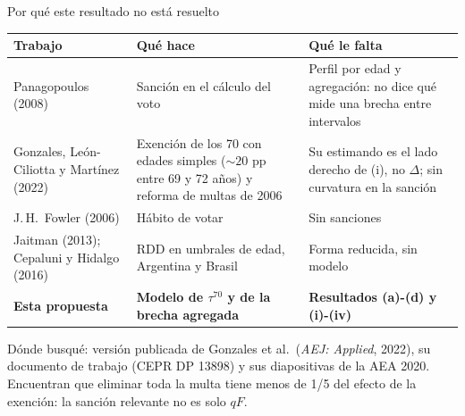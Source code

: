 \documentclass[aspectratio=169,11pt,xcolor=table]{beamer}
\begin{document}
\begin{frame}{Por qué este resultado no está resuelto}
  \footnotesize
  \renewcommand{\arraystretch}{1.4}
  \begin{tabularx}{\textwidth}{@{}L{3.6cm}YY@{}}
    \toprule
    \textbf{Trabajo} & \textbf{Qué hace} & \textbf{Qué le falta} \\
    \midrule
    Panagopoulos (2008) & Sanción en el cálculo del voto & Perfil por edad y agregación: no dice qué mide una brecha entre intervalos \\
    Gonzales, León-Ciliotta y Martínez (2022) & Exención de los 70 con edades simples (${\sim}20$ pp entre 69 y 72 años) y reforma de multas de 2006 & Su estimando es el lado derecho de (i), no $\Delta$; sin curvatura en la sanción \\
    J.\,H.\ Fowler (2006) & Hábito de votar & Sin sanciones \\
    Jaitman (2013); Cepaluni y Hidalgo (2016) & RDD en umbrales de edad, Argentina y Brasil & Forma reducida, sin modelo \\
    \textbf{Esta propuesta} & \textbf{Modelo de $\tau^{70}$ y de la brecha agregada} & \textbf{Resultados (a)-(d) y (i)-(iv)} \\
    \bottomrule
  \end{tabularx}
  \vspace{0.1cm}
  {\scriptsize\color{upgray} Dónde busqué: versión publicada de Gonzales et al.\ (\textit{AEJ: Applied}, 2022), su documento de trabajo (CEPR DP 13898) y sus diapositivas de la AEA 2020. Encuentran que eliminar toda la multa tiene menos de 1/5 del efecto de la exención: la sanción relevante no es solo $qF$.\par}
\end{frame}
\end{document}
